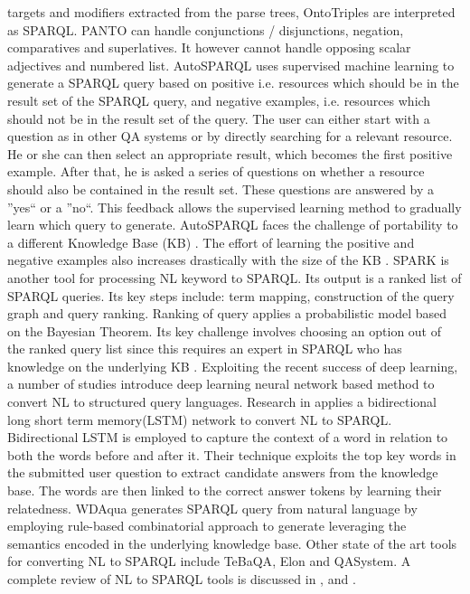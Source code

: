 \documentclass[review]{elsarticle}
\begin{document}
targets and modifiers extracted from the parse trees, OntoTriples are interpreted as SPARQL. PANTO can handle conjunctions / disjunctions, negation, comparatives and superlatives. It however cannot handle opposing scalar adjectives and numbered list. AutoSPARQL \citep{autosparql12} uses  supervised machine learning to generate a SPARQL query based on positive i.e. resources which should be in the result set of the SPARQL query, and negative examples, i.e. resources which should not be in the result set of the query. The user can either start with a question as in other QA systems or by directly searching for a relevant resource. He or she can then select  an appropriate result, which becomes the first positive example. After that, he is asked a series of questions on whether a resource should also be contained in the result set. These questions are answered by  a ”yes“ or  a ”no“. This feedback allows the supervised learning method to gradually learn which query to generate. AutoSPARQL faces the challenge of  portability to a different Knowledge Base (KB) \citep{ontologysparql12}. The  effort of learning the positive and negative examples also increases drastically with the size of the KB \citep{ontologysparql12}. SPARK \citep{sparklis12} is another tool for  processing NL keyword to SPARQL.  Its  output is a ranked list of SPARQL queries.  Its key  steps include: term mapping, construction of the query graph and query ranking. Ranking of query applies a   probabilistic model based on the Bayesian Theorem. Its key challenge involves choosing an option out of the ranked query list since this requires  an expert in SPARQL who has  knowledge on the underlying KB  \citep{ontologysparql12}. Exploiting the recent success of deep learning, a number of studies introduce deep learning neural network based method to convert NL to structured query languages. Research in \citep{sema2019} applies a bidirectional long short term memory(LSTM) \citep{sema1997} network to convert NL to SPARQL. Bidirectional LSTM is employed  to capture the context of a word in relation to both the words before  and after  it. Their technique exploits the top key words in the submitted user question to extract candidate answers from the knowledge base. The words  are then linked to the correct answer tokens by learning their relatedness. WDAqua \citep{quad92018} generates SPARQL query from natural language  by employing rule-based  combinatorial approach to generate leveraging the semantics encoded in the underlying knowledge base.  Other state of the art tools for converting NL to SPARQL include  TeBaQA\citep{quad92018}, Elon\citep{quad92018} and QASystem\citep{quad92018}.  A complete review of NL to SPARQL tools is discussed in \citep{review1} , \citep{review2} and \citep{noma2018}. 
\end{document}

